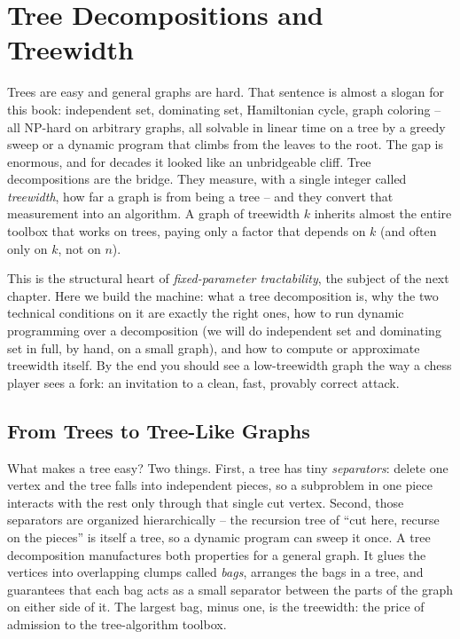 \chapter{Tree Decompositions and Treewidth}

Trees are easy and general graphs are hard. That sentence is almost a slogan for
this book: independent set, dominating set, Hamiltonian cycle, graph coloring --
all NP-hard on arbitrary graphs, all solvable in linear time on a tree by a
greedy sweep or a dynamic program that climbs from the leaves to the root. The
gap is enormous, and for decades it looked like an unbridgeable cliff. Tree
decompositions are the bridge. They measure, with a single integer called
\emph{treewidth}, how far a graph is from being a tree -- and they convert that
measurement into an algorithm. A graph of treewidth $k$ inherits almost the
entire toolbox that works on trees, paying only a factor that depends on $k$ (and
often only on $k$, not on $n$).

This is the structural heart of \emph{fixed-parameter tractability}, the subject
of the next chapter. Here we build the machine: what a tree decomposition is, why
the two technical conditions on it are exactly the right ones, how to run dynamic
programming over a decomposition (we will do independent set and dominating set
in full, by hand, on a small graph), and how to compute or approximate treewidth
itself. By the end you should see a low-treewidth graph the way a chess player
sees a fork: an invitation to a clean, fast, provably correct attack.

\chapterline

\section{From Trees to Tree-Like Graphs}
\label{ch24:intro}

\begin{intuitionbox}
What makes a tree easy? Two things. First, a tree has tiny \emph{separators}:
delete one vertex and the tree falls into independent pieces, so a subproblem in
one piece interacts with the rest only through that single cut vertex. Second,
those separators are organized hierarchically -- the recursion tree of ``cut
here, recurse on the pieces'' is itself a tree, so a dynamic program can sweep it
once. A tree decomposition manufactures both properties for a general graph. It
glues the vertices into overlapping clumps called \emph{bags}, arranges the bags
in a tree, and guarantees that each bag acts as a small separator between the
parts of the graph on either side of it. The largest bag, minus one, is the
treewidth: the price of admission to the tree-algorithm toolbox.
\end{intuitionbox}

